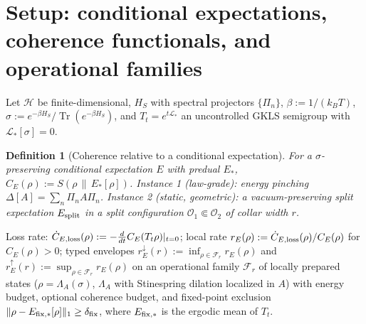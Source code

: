 \documentclass[11pt]{article}
\newtheorem{definition}[theorem]{Definition}
\theoremstyle{remark}
\newcommand{\Tr}{\operatorname{Tr}}
\begin{document}
\section{Setup: conditional expectations, coherence functionals, and
operational families}
Let $\mathcal{H}$ be finite-dimensional, $H_S$ with spectral projectors
$\{\Pi_n\}$, $\beta := 1/(k_B T)$, $\sigma := e^{-\beta H_S}/
\Tr(e^{-\beta H_S})$, and $T_t = e^{t\mathcal{L}_*}$ an uncontrolled GKLS
semigroup with $\mathcal{L}_*[\sigma] = 0$.
\begin{definition}[Coherence relative to a conditional expectation]
For a $\sigma$-preserving conditional expectation $E$ with predual $E_*$,
$C_E(\rho) := S(\rho\,\|\,E_*[\rho])$. Instance 1 (law-grade): energy
pinching $\Delta[A] = \sum_n \Pi_n A \Pi_n$. Instance 2 (static,
geometric): a vacuum-preserving split expectation $E_{\rm split}$ in a
split configuration $\mathcal{O}_1 \Subset \mathcal{O}_2$ of collar width
$r$.
\end{definition}
Loss rate: $\dot C_{E,\rm loss}(\rho) := -\frac{d}{dt}C_E(T_t\rho)|_{t=0}$;
local rate $r_E(\rho) := \dot C_{E,\rm loss}(\rho)/C_E(\rho)$ for
$C_E(\rho) > 0$; typed envelopes $r^\downarrow_E(r) := \inf_{\rho \in
\mathcal{F}_r} r_E(\rho)$ and $r^\uparrow_E(r) := \sup_{\rho \in
\mathcal{F}_r} r_E(\rho)$ on an operational family $\mathcal{F}_r$ of
locally prepared states ($\rho = \Lambda_A(\sigma)$, $\Lambda_A$ with
Stinespring dilation localized in $A$) with energy budget, optional
coherence budget, and fixed-point exclusion
$\|\rho - E_{\rm fix,*}[\rho]\|_1 \ge \delta_{\rm fix}$, where
$E_{\rm fix,*}$ is the ergodic mean of $T_t$.
\end{document}
